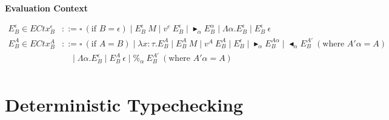 \documentclass[9pt, a4paper]{extarticle}
\theoremstyle{break}
\newcommand{\figheader}[2]{
  \begin{flushleft}
    #2 {\bf \normalsize #1}
\end{flushleft}}
\newcommand{\TB}{\blacktriangleright}
\newcommand{\TBL}{\blacktriangleleft}
\begin{document}
\figheader{Evaluation Context}{}
\begin{align*}
    E^\epsilon_B \in ECtx^\epsilon_B & ::= \square\ (\text{if\ } B = \epsilon) \mid E^\epsilon_B\ M \mid v^e\ E^\epsilon_B
                                           \mid \TB_\alpha E^\alpha_B \mid \Lambda\alpha.E^\epsilon_B
                                           \mid E^\epsilon_B\ \epsilon  \\
    E^A_B \in ECtx^A_B & ::= \square\ (\text{if } A = B) \mid \lambda x:\tau.E^A_B \mid E^A_B\ M \mid v^A\ E^A_B
                                           \mid E^\epsilon_B \mid \TB_\alpha E^{A\alpha}_B
                                           \mid \TBL_\alpha E^{A'}_B \ (\text{where } A'\alpha = A) \\
                                           & \quad \mid \Lambda\alpha.E^\epsilon_B
                                           \mid E^A_B\ \epsilon \mid \%_\alpha\ E^{A'}_B \ (\text{where } A'\alpha = A)\\
\end{align*}

\section{ Deterministic Typechecking }
\end{document}
